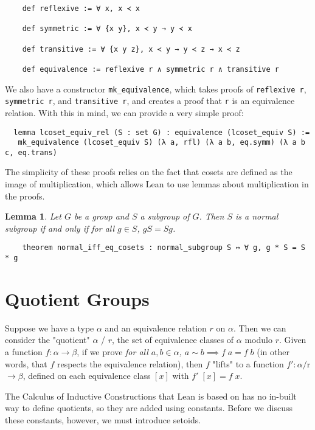 \documentclass[runningheads,a4paper]{llncs}
\renewcommand{\a}{\alpha}
\renewcommand{\b}{\beta}
\renewcommand{\-}{\setminus}
\newtheorem{lemma}[theorem]{Lemma}
\begin{document}
\begin{lstlisting}
    def reflexive := ∀ x, x ≺ x

    def symmetric := ∀ {x y}, x ≺ y → y ≺ x

    def transitive := ∀ {x y z}, x ≺ y → y ≺ z → x ≺ z

    def equivalence := reflexive r ∧ symmetric r ∧ transitive r
\end{lstlisting}

We also have a constructor \lstinline{mk_equivalence}, which takes proofs of \lstinline{reflexive r}, \lstinline{symmetric r}, and \lstinline{transitive r}, and creates a proof that \lstinline{r} is an equivalence relation. With this in mind, we can provide a very simple proof:

\begin{lstlisting}
  lemma lcoset_equiv_rel (S : set G) : equivalence (lcoset_equiv S) := 
   mk_equivalence (lcoset_equiv S) (λ a, rfl) (λ a b, eq.symm) (λ a b c, eq.trans)
\end{lstlisting}

The simplicity of these proofs relies on the fact that cosets are defined as the image of multiplication, which allows Lean to use lemmas about multiplication in the proofs.

\begin{lemma}
Let $G$ be a group and $S$ a subgroup of $G$. Then $S$ is a normal subgroup if and only if for all $g \in S$, $gS = Sg$.
\end{lemma}

\begin{lstlisting}
    theorem normal_iff_eq_cosets : normal_subgroup S ↔ ∀ g, g * S = S * g
\end{lstlisting}

\section{Quotient Groups}

Suppose we have a type $\a$ and an equivalence relation $r$ on $\a$. Then we can consider the "quotient" $\a$ / $r$, the set of equivalence classes of $\a$ modulo $r$. Given a function $f : \a \to \b$, if we prove \textit{for all $a, b \in \a$, $a \sim b \implies f \; a = f\; b$} (in other words, that $f$ respects the equivalence relation), then $f$ "lifts" to a function $f' : \a / $r$ \to \b$, defined on each equivalence class $[x]$ with $f'\; [x] = f\; x$.

The Calculus of Inductive Constructions that Lean is based on has no in-built way to define quotients, so they are added using constants. Before we discuss these constants, however, we must introduce setoids.
\end{document}
